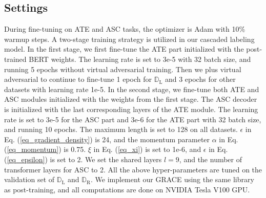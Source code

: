 \documentclass[11pt,a4paper]{article}
\begin{document}
\subsection{Settings}
During fine-tuning on ATE and ASC tasks, the optimizer is Adam with 10\% warmup steps. A two-stage training strategy is utilized in our cascaded labeling model. In the first stage, we first fine-tune the ATE part initialized with the post-trained BERT weights. The learning rate is set to 3e-5 with 32 batch size, and running 5 epochs without virtual adversarial training. Then we plus virtual adversarial to continue to fine-tune 1 epoch for $\mathbb{D}_\text{L}$ and 3 epochs for other datasets with learning rate 1e-5. In the second stage, we fine-tune both ATE and ASC modules initialized with the weights from the first stage. The ASC decoder is initialized with the last corresponding layers of the ATE module. The learning rate is set to 3e-5 for the ASC part and 3e-6 for the ATE part with 32 batch size, and running 10 epochs. The maximum length is set to 128 on all datasets. $\epsilon$ in Eq. (\ref{eq_gradient_density}) is 24, and the momentum parameter $\alpha$ in Eq. (\ref{eq_momentum}) is 0.75. $\xi$ in Eq. (\ref{eq_xi}) is set to 1e-6, and $\epsilon$ in Eq. (\ref{eq_epsilon}) is set to 2. We set the shared layers $l=9$, and the number of transformer layers for ASC to 2. All the above hyper-parameters are tuned on the validation set of $\mathbb{D}_\text{L}$ and $\mathbb{D}_\text{R}$. We implement our GRACE using the same library as post-training, and all computations are done on NVIDIA Tesla V100 GPU.
\end{document}
